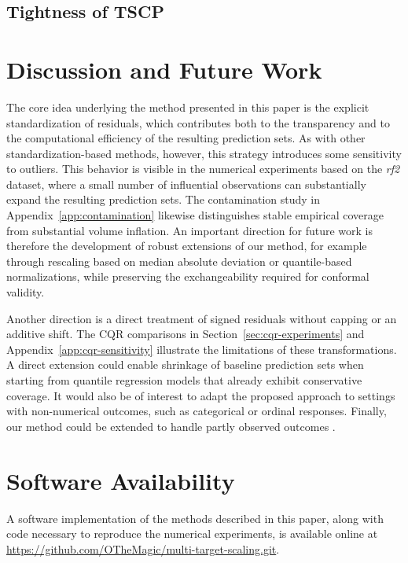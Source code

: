 \subsection{Tightness of TSCP}\label{sec:tightness}




\clearpage


\section{Discussion and Future Work}
\label{sec:discussion}

The core idea underlying the method presented in this paper is the explicit standardization of residuals, which contributes both to the transparency and to the computational efficiency of the resulting prediction sets. As with other standardization-based methods, however, this strategy introduces some sensitivity to outliers. This behavior is visible in the numerical experiments based on the \emph{rf2} dataset, where a small number of influential observations can substantially expand the resulting prediction sets. The contamination study in Appendix~\ref{app:contamination} likewise distinguishes stable empirical coverage from substantial volume inflation. An important direction for future work is therefore the development of robust extensions of our method, for example through rescaling based on median absolute deviation or quantile-based normalizations, while preserving the exchangeability required for conformal validity.

Another direction is a direct treatment of signed residuals without capping or an additive shift. The CQR comparisons in Section~\ref{sec:cqr-experiments} and Appendix~\ref{app:cqr-sensitivity} illustrate the limitations of these transformations. A direct extension could enable shrinkage of baseline prediction sets when starting from quantile regression models that already exhibit conservative coverage. It would also be of interest to adapt the proposed approach to settings with non-numerical outcomes, such as categorical or ordinal responses. Finally, our method could be extended to handle partly observed outcomes \citep{braun2025multivariate}.

\section*{Software Availability}

A software implementation of the methods described in this paper, along with code necessary to reproduce the numerical experiments, is available online at \url{https://github.com/OTheMagic/multi-target-scaling.git}.



